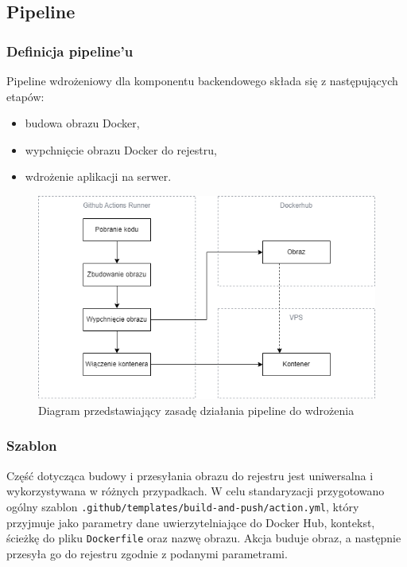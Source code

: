 \documentclass{article}
\begin{document}
\subsection{Pipeline}

\subsubsection{Definicja pipeline'u}

Pipeline wdrożeniowy dla komponentu backendowego składa się z następujących etapów:

\begin{itemize}
    \item budowa obrazu Docker,
    \item wypchnięcie obrazu Docker do rejestru,
    \item wdrożenie aplikacji na serwer.
\end{itemize}

\begin{figure}[H]
    \centering
    \includegraphics[width=0.75\linewidth]{githubActionsSchema.png}
    \caption{Diagram przedstawiający zasadę działania pipeline do wdrożenia}
    \label{fig:enter-label}
\end{figure}

\subsubsection{Szablon}

Część dotycząca budowy i przesyłania obrazu do rejestru jest uniwersalna i wykorzystywana w różnych przypadkach. W celu standaryzacji przygotowano ogólny szablon \lstinline|.github/templates/build-and-push/action.yml|, który przyjmuje jako parametry dane uwierzytelniające do Docker Hub, kontekst, ścieżkę do pliku \lstinline|Dockerfile| oraz nazwę obrazu. Akcja buduje obraz, a następnie przesyła go do rejestru zgodnie z podanymi parametrami.
\end{document}

